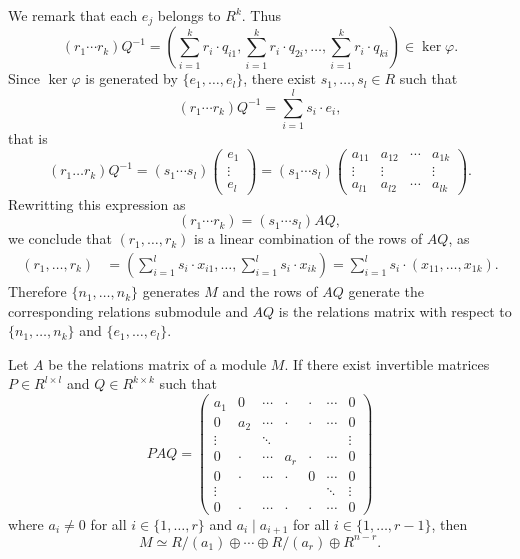 We remark that each $e_j$ belongs to $R^k$. Thus 
\[
(r_1\cdots r_k)Q^{-1} = \left(\sum_{i=1}^k r_i\cdot q_{i1},\sum_{i=1}^k r_i\cdot q_{2i},\dots,\sum_{i=1}^k r_i\cdot q_{ki}\right)\in \ker\varphi.
\]
Since $\ker\varphi$ is generated by $\{e_1,\dots,e_l\}$, there exist 
$s_1,\dots,s_l\in R$ such that 
\[
	(r_1\cdots r_k)Q^{-1}=\sum_{i=1}^l s_i\cdot e_i,
\]
that is 
\[
(r_1\dots r_k)Q^{-1}=(s_1\cdots s_l)\begin{pmatrix}e_1\\\vdots\\ e_l\end{pmatrix}
=(s_1\cdots s_l)\begin{pmatrix}
a_{11} & a_{12} & \cdots & a_{1k}\\
\vdots & \vdots & & \vdots\\
a_{l1} & a_{l2} & \cdots & a_{lk}	
\end{pmatrix}
.
\]
Rewritting this expression as 
\[
(r_1\cdots r_k)=(s_1\cdots s_l)AQ,
\]
we conclude that  $(r_1,\dots,r_k)$ is a linear combination of the rows of $AQ$, as 
\begin{align*}
(r_1,\dots,r_k)&=\left(\sum_{i=1}^l s_i\cdot x_{i1},\dots,\sum_{i=1}^l s_i\cdot x_{ik}\right)
=\sum_{i=1}^l s_i\cdot (x_{11},\dots,x_{1k}).
\end{align*}
Therefore $\{n_1,\dots,n_k\}$ generates $M$ and the rows of $AQ$ generate the
corresponding relations submodule and $AQ$ is the relations matrix with respect
to $\{n_1,\dots,n_k\}$ and $\{e_1,\dots,e_l\}$. 

\begin{proposition}
	Let $A$ be the relations matrix of a module $M$. 
	If there exist invertible matrices $P\in R^{l\times l}$ and $Q\in R^{k\times k}$ such that 
	\[
		PAQ=
		\begin{pmatrix}
			a_1 & 0 & \cdots & \cdot & \cdot & \cdots & 0\\
			0 & a_2 & \cdots & \cdot & \cdot & \cdots & 0\\
			\vdots && \ddots &  & & & \vdots\\	
			0 & \cdot & \cdots & a_r & \cdot & \cdots & 0\\	
			0 & \cdot & \cdots & \cdot & 0 & \cdots & 0\\	
			\vdots &&&&&\ddots &\vdots\\
			0 & \cdot & \cdots & \cdot & \cdot & \cdots & 0
		\end{pmatrix}
	\]
	where $a_i\ne0$ for all $i\in\{1,\dots,r\}$ and  $a_i\mid a_{i+1}$ for all
	$i\in\{1,\dots,r-1\}$,  then 
	\[
		M\simeq R/(a_1)\oplus\cdots\oplus R/(a_r)\oplus R^{n-r}.
	\]
\end{proposition}


